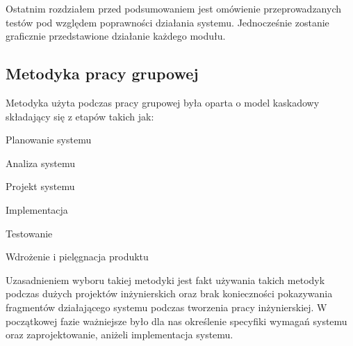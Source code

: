 Ostatnim rozdziałem przed podsumowaniem jest omówienie przeprowadzanych testów pod względem poprawności działania systemu. Jednocześnie zostanie graficznie przedstawione działanie każdego modułu.

\newpage
\subsection{Metodyka pracy grupowej}
Metodyka użyta podczas pracy grupowej była oparta o model kaskadowy \cite{waterfall} składający się z etapów takich jak:
\begin{itemize*}
	\item Planowanie systemu
	\item Analiza systemu
	\item Projekt systemu
	\item Implementacja
	\item Testowanie
	\item Wdrożenie i pielęgnacja produktu
\end{itemize*}

Uzasadnieniem wyboru takiej metodyki jest fakt używania takich metodyk podczas dużych projektów inżynierskich oraz brak konieczności pokazywania fragmentów działającego systemu podczas tworzenia pracy inżynierskiej. W początkowej fazie ważniejsze było dla nas określenie specyfiki wymagań systemu oraz zaprojektowanie, aniżeli implementacja systemu.